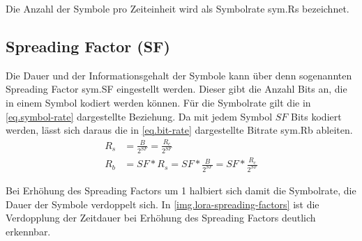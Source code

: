 Die Anzahl der Symbole pro Zeiteinheit wird als Symbolrate \gls{sym.Rs} bezeichnet.


\subsection{Spreading Factor (SF)}\label{sec.lora.sf}
Die Dauer und der Informationsgehalt der Symbole kann über denn sogenannten Spreading Factor \gls{sym.SF} eingestellt werden.
Dieser gibt die Anzahl Bits an, die in einem Symbol kodiert werden können.
Für die Symbolrate gilt die in \autoref{eq.symbol-rate} dargestellte Beziehung.
Da mit jedem Symbol $SF$ Bits kodiert werden, lässt sich daraus die in \autoref{eq.bit-rate} dargestellte Bitrate \gls{sym.Rb} ableiten.
\cite[S. 10]{loramodulation}
\begin{align}
	R_s & = \frac{B}{2^{SF}} = \frac{R_c}{2^{SF}} \label{eq.symbol-rate}\\
	R_b & = SF * R_s = SF * \frac{B}{2^{SF}} = SF * \frac{R_c}{2^{SF}} \label{eq.bit-rate}
\end{align}

Bei Erhöhung des Spreading Factors um 1 halbiert sich damit die Symbolrate, die Dauer der Symbole verdoppelt sich.
In \autoref{img.lora-spreading-factors} ist die Verdopplung der Zeitdauer bei Erhöhung des Spreading Factors deutlich erkennbar.

